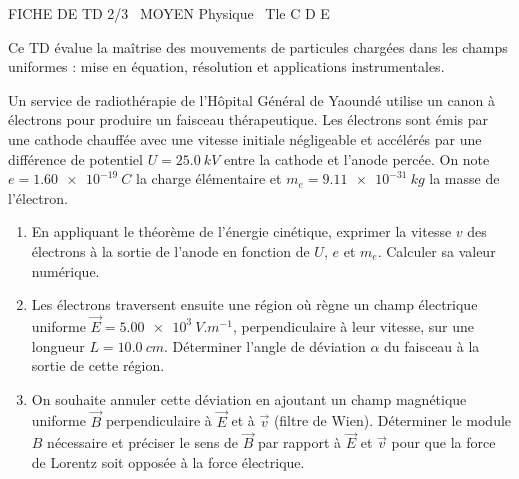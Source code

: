 \documentclass[11pt]{article}
\begin{document}
\begin{tcolorbox}[enhanced,colback=popink,colframe=popink,arc=10pt,boxrule=0pt,left=12pt,right=12pt,top=9pt,bottom=9pt]
{\color{white}\popxbold\small FICHE DE TD 2/3 \textbullet\ MOYEN \hfill Physique \textbullet\ Tle C D E\par}
\end{tcolorbox}
\vspace{4pt}
Ce TD évalue la maîtrise des mouvements de particules chargées dans les champs uniformes : mise en équation, résolution et applications instrumentales.

\begin{exercice}
Un service de radiothérapie de l'Hôpital Général de Yaoundé utilise un canon à électrons pour produire un faisceau thérapeutique. Les électrons sont émis par une cathode chauffée avec une vitesse initiale négligeable et accélérés par une différence de potentiel $U = \SI{25,0}{kV}$ entre la cathode et l'anode percée. On note $e = \SI{1,60e-19}{C}$ la charge élémentaire et $m_e = \SI{9,11e-31}{kg}$ la masse de l'électron.
\begin{enumerate}
    \item En appliquant le théorème de l'énergie cinétique, exprimer la vitesse $v$ des électrons à la sortie de l'anode en fonction de $U$, $e$ et $m_e$. Calculer sa valeur numérique.
    \item Les électrons traversent ensuite une région où règne un champ électrique uniforme $\vec{E} = \SI{5,00e3}{V.m^{-1}}$, perpendiculaire à leur vitesse, sur une longueur $L = \SI{10,0}{cm}$. Déterminer l'angle de déviation $\alpha$ du faisceau à la sortie de cette région.
    \item On souhaite annuler cette déviation en ajoutant un champ magnétique uniforme $\vec{B}$ perpendiculaire à $\vec{E}$ et à $\vec{v}$ (filtre de Wien). Déterminer le module $B$ nécessaire et préciser le sens de $\vec{B}$ par rapport à $\vec{E}$ et $\vec{v}$ pour que la force de Lorentz soit opposée à la force électrique.
\end{enumerate}
\end{exercice}
\end{document}
